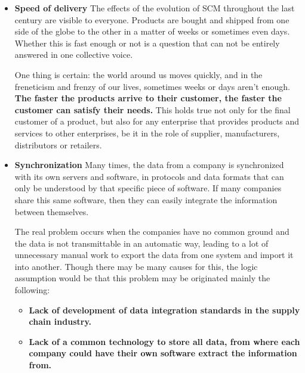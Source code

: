 
\begin{itemize}
\item \textbf{Speed of delivery}
The effects of the evolution of SCM throughout the last century are visible to everyone. Products are bought and shipped from one side of the globe to the other in a matter of weeks or sometimes even days. Whether this is fast enough or not is a question that can not be entirely answered in one collective voice. 

One thing is certain: the world around us moves quickly, and in the freneticism and frenzy of our lives, sometimes weeks or days aren't enough.  \textbf{The faster the products arrive to their customer, the faster the customer can satisfy their needs.}  This holds true not only for the final customer of a product, but also for any enterprise that provides products and services to other enterprises, be it in the role of supplier, manufacturers, distributors or retailers. 

\item \textbf{Synchronization}
Many times, the data from a company is synchronized with its own servers and software, in protocols and data formats that can only be understood by that specific piece of software. If many companies share this same software, then they can easily integrate the information between themselves.

The real problem occurs when the companies have no common ground and the data is not transmittable in an automatic way, leading to a lot of unnecessary manual work to export the data from one system and import it into another. Though there may be many causes for this, the logic assumption would be that this problem may be originated mainly the following:
\begin{itemize}
\item \textbf{Lack of development of data integration standards in the supply chain industry.}
\item \textbf{Lack of a common technology to store all data, from where each company could have their own software extract the information from.}
\end{itemize}


\end{itemize}
